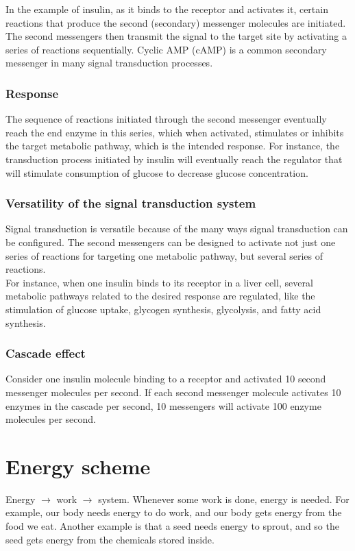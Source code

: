 \documentclass[11pt]{article}
\begin{document}
In the example of insulin, as it binds to the receptor and activates it, certain reactions that produce the second (secondary) messenger molecules are initiated. The second messengers then transmit the signal to the target site by activating a series of reactions sequentially. Cyclic AMP (cAMP) is a common secondary messenger in many signal transduction processes.

\subsubsection{Response}
\label{sec:org066ba77}
The sequence of reactions initiated through the second messenger eventually reach the end enzyme in this series, which when activated, stimulates or inhibits the target metabolic pathway, which is the intended response. For instance, the transduction process initiated by insulin will eventually reach the regulator that will stimulate consumption of glucose to decrease glucose concentration.

\newpage

\subsubsection{Versatility of the signal transduction system}
\label{sec:org38ddb29}
Signal transduction is versatile because of the many ways signal transduction can be configured. The second messengers can be designed to activate not just one series of reactions for targeting one metabolic pathway, but several series of reactions.
\\[0pt]

For instance, when one insulin binds to its receptor in a liver cell, several metabolic pathways related to the desired response are regulated, like the stimulation of glucose uptake, glycogen synthesis, glycolysis, and fatty acid synthesis.

\subsubsection{Cascade effect}
\label{sec:orgaf733f6}
Consider one insulin molecule binding to a receptor and activated 10 second messenger molecules per second. If each second messenger molecule activates 10 enzymes in the cascade per second, 10 messengers will activate 100 enzyme molecules per second.


\section{Energy scheme}
\label{sec:org3aabb29}
Energy \(\rightarrow\) work \(\rightarrow\) system. Whenever some work is done, energy is needed. For example, our body needs energy to do work, and our body gets energy from the food we eat. Another example is that a seed needs energy to sprout, and so the seed gets energy from the chemicals stored inside.
\end{document}
